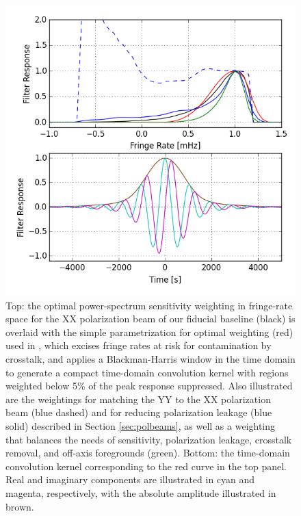 \documentclass[twocolumn,apj,numberedappendix]{emulateapj}
\begin{document}
\begin{figure}[!t]
\centering
\includegraphics[width=\columnwidth]{plots/fringe_rate_cut.png}
\caption{
Top: the optimal power-spectrum sensitivity weighting in fringe-rate space 
for the XX polarization beam of our fiducial baseline (black) is overlaid with
the simple parametrization for optimal weighting (red) used in \citet{ali_et_al2015},
which excises fringe rates at risk for contamination by crosstalk, and 
applies a Blackman-Harris window in the time domain to
generate a compact time-domain convolution kernel with regions weighted below 5\% of the
peak response suppressed.
Also illustrated
are the weightings for matching the YY to the XX polarization beam (blue dashed) and
for reducing polarization leakage (blue solid) described in Section \ref{sec:polbeams}, as well
as a weighting that balances the needs of sensitivity, polarization leakage, crosstalk
removal, and off-axis foregrounds (green).  Bottom: the time-domain convolution kernel
corresponding to the red curve in the top panel.  Real and imaginary components are
illustrated in cyan and magenta, respectively, with the absolute amplitude illustrated
in brown.
}
\label{fig:fringe_rate_cut}
\end{figure}
\end{document}
